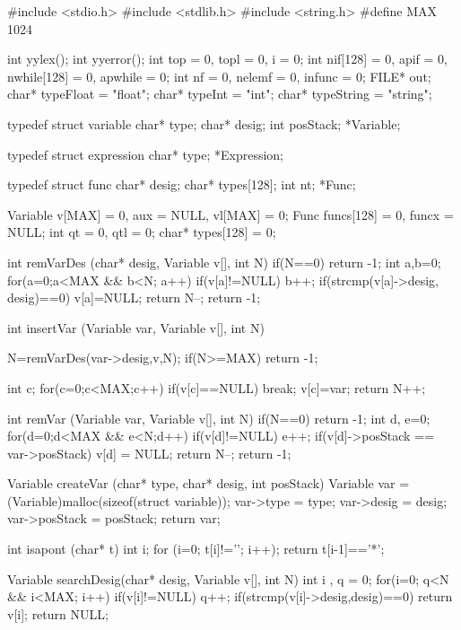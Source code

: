 \documentclass{report}
\begin{document}
\begin{code}

#include <stdio.h>
#include <stdlib.h>
#include <string.h>
#define MAX 1024

   int yylex();
   int yyerror();
   int top = 0, topl = 0, i = 0;
   int nif[128] = {0}, apif = 0, nwhile[128] = {0}, apwhile = 0;
   int nf = 0, nelemf = 0, infunc = 0;
   FILE* out;
   char* typeFloat = "float";
   char* typeInt = "int";
   char* typeString = "string";

   typedef struct variable{
      char* type;
      char* desig;
      int posStack;
   } *Variable;

   typedef struct expression{
      char* type;
   } *Expression;

   typedef struct func{
      char* desig;
      char* types[128];
      int nt;
   } *Func;

   Variable v[MAX] = {0}, aux = NULL, vl[MAX] = {0};
   Func funcs[128] = {0}, funcx = NULL;
   int qt = 0, qtl = 0;
   char* types[128] = {0};

   int remVarDes (char* desig, Variable v[], int N){
      if(N==0) return -1;
      int a,b=0;
      for(a=0;a<MAX && b<N; a++){
         if(v[a]!=NULL) b++;
         if(strcmp(v[a]->desig, desig)==0){
            v[a]=NULL;
            return N--;
         }
      }
      return -1;
   }

   int insertVar (Variable var, Variable v[], int N){
      N=remVarDes(var->desig,v,N);
      if(N>=MAX) return -1;

      int c;
      for(c=0;c<MAX;c++){
         if(v[c]==NULL) break;
      }
      v[c]=var;
      return N++;
   }

   int remVar (Variable var, Variable v[], int N){
      if(N==0) return -1;
      int d, e=0;
      for(d=0;d<MAX && e<N;d++){
         if(v[d]!=NULL) e++;
         if(v[d]->posStack == var->posStack){
          v[d] = NULL;
          return N--;
         }
      }
      return -1;
   }

   Variable createVar (char* type, char* desig, int posStack){
      Variable var = (Variable)malloc(sizeof(struct variable));
      var->type = type;
      var->desig = desig;
      var->posStack = posStack;
      return var;
   }

   int isapont (char* t){
	    int i;
	    for (i=0; t[i]!='\0'; i++);
	    return t[i-1]=='*';
    }

    Variable searchDesig(char* desig, Variable v[], int N){
        int i , q = 0;
        for(i=0; q<N && i<MAX; i++){
            if(v[i]!=NULL) q++;
            if(strcmp(v[i]->desig,desig)==0){
                return v[i];
            }
        }
        return NULL;  
    }


\end{code}
\end{document}
